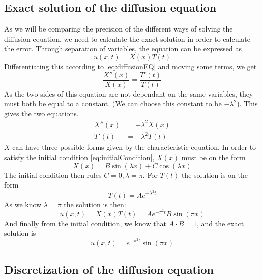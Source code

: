 \subsection{Exact solution of the diffusion equation}
As we will be comparing the precision of the different ways of solving the diffusion equation, we need to calculate the exact solution in order to calculate the error.
Through separation of variables, the equation can be expressed as
\begin{equation}
u(x,t) = X(x)T(t)
\label{eq:separated}
\end{equation}
Differentiating this according to \eqref{eq:diffusionEQ} and moving some terms, we get
\begin{equation*}
\frac{X''(x)}{X(x)} = \frac{T'(t)}{T(t)}
\end{equation*}
As the two sides of this equation are not dependant on the same variables, they must both be equal to a constant. (We can choose this constant to be $-\lambda ^2$). This gives the two equations.
\begin{equation*}
\begin{split}
X''(x) &= -\lambda ^2 X(x) \\
T'(t) &= -\lambda^2 T(t)
\end{split}
\end{equation*}
$X$ can have three possible forms given by the characteristic equation. In order to satisfy the initial condition \eqref{eq:initialCondition}, $X(x)$ must be on the form
\begin{equation*}
X(x) = B\sin(\lambda x) + C\cos(\lambda x)
\end{equation*}
The initial condition then rules $C=0, \lambda = \pi$. For $T(t)$ the solution is on the form
\begin{equation*}
T(t) = Ae^{-\lambda^2t}
\end{equation*}
As we know $\lambda =\pi$ the solution is then:
\begin{equation*}
u(x,t) = X(x)T(t) = Ae^{-\pi^2 t}B\sin(\pi x)
\end{equation*}
And finally from the initial condition, we know that $A\cdot B = 1$, and the exact solution is
\begin{equation}
u(x,t) = e^{-\pi^2 t}\sin(\pi x)
\label{eq:exact}
\end{equation}

\subsection{Discretization of the diffusion equation}

